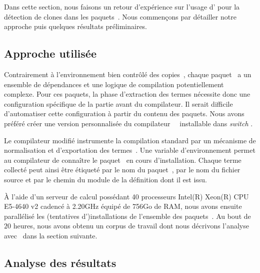 
Dans cette section, nous faisons un retour d'expérience sur l'usage
d'{\Asak} pour la détection de clones dans les paquets~\Opam. Nous
commençons par détailler notre approche puis quelques résultats
préliminaires.


\subsection{Approche utilisée}

Contrairement à l'environnement bien contrôlé des
copies~{\LearnOCaml}, chaque paquet~{\Opam} a un ensemble de
dépendances et une logique de compilation potentiellement complexe.
Pour ces paquets, la phase d'extraction des termes {\LambdaCode}
nécessite donc une configuration spécifique de la partie avant du
compilateur. Il serait difficile d'automatiser cette configuration à
partir du contenu des paquets. Nous avons préféré créer une version
personnalisée du compilateur~{\OCaml}~\cite{custom-ocaml} installable
dans \textit{switch} {\Opam}.

Le compilateur modifié instrumente la compilation standard par un
mécanisme de normalisation et d'exportation des termes~{\LambdaCode}.
Une variable d'environnement permet au compilateur de connaître le
paquet~{\Opam} en cours d'installation. Chaque terme collecté peut
ainsi être étiqueté par le nom du paquet~\Opam, par le nom du fichier
source et par le chemin du module de la définition dont il est issu.

À l'aide d'un serveur de calcul possédant 40 processeurs Intel(R)
Xeon(R) CPU E5-4640 v2 cadencé à 2.20GHz équipé de 756Go de RAM, nous
avons ensuite parallélisé les (tentatives d')installations de
l'ensemble des paquets~\Opam. Au bout de~$20$ heures, nous avons
obtenu un corpus de travail dont nous décrivons l'analyse avec~{\Asak} dans
la section suivante.

\subsection{Analyse des résultats}

